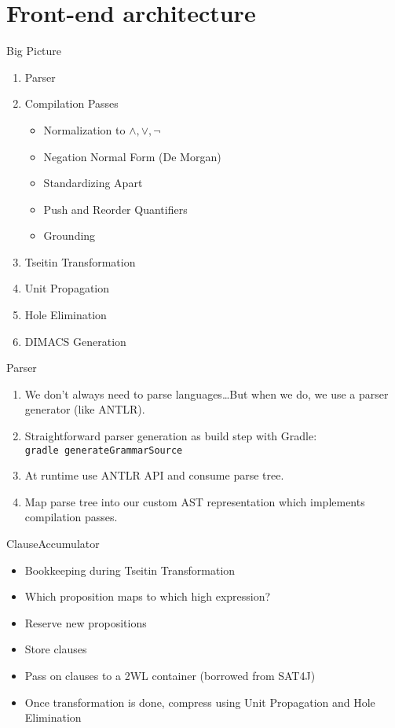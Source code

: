\documentclass[smaller,dvipsnames]{beamer}
\begin{document}
  \section{Front-end architecture}

  \begin{frame}{Big Picture}
    \begin{enumerate}
    	\item Parser
    	\item Compilation Passes
    	\begin{itemize}
    		\item Normalization to $\land, \lor, \neg$
    		\item Negation Normal Form (De Morgan)
    		\item Standardizing Apart
    		\item Push and Reorder Quantifiers
    		\item Grounding
    	\end{itemize}
    	\item Tseitin Transformation
    	\item Unit Propagation
    	\item Hole Elimination
    	\item DIMACS Generation
    \end{enumerate}
  \end{frame}

  \begin{frame}{Parser}
  	\begin{enumerate}
  		\item We don't always need to parse languages\dots \newline But when we do, we use a parser generator (like ANTLR).
  		\item Straightforward parser generation as build step with Gradle: \texttt{gradle~generateGrammarSource}
  		\item At runtime use ANTLR API and consume parse tree.
  		\item Map parse tree into our custom AST representation which implements compilation passes.
  	\end{enumerate}
  \end{frame}

  \begin{frame}{ClauseAccumulator}
  	\begin{itemize}
	  	\item Bookkeeping during Tseitin Transformation
  		\item Which proposition maps to which high expression?
  		\item Reserve new propositions
	  	\item Store clauses
	  	\item Pass on clauses to a 2WL container (borrowed from SAT4J)
	  	\item Once transformation is done, compress using Unit Propagation and Hole Elimination
  	\end{itemize}
  \end{frame}
\end{document}
